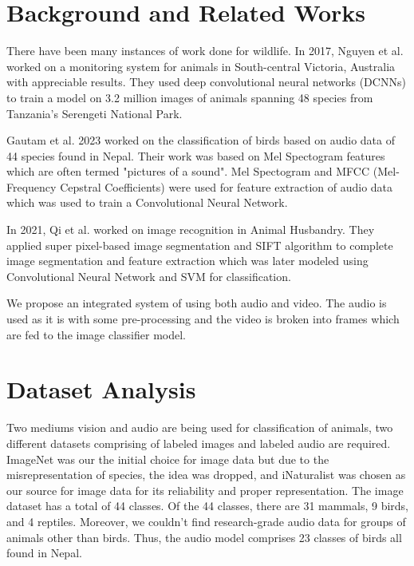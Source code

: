 \documentclass[fleqn, 10pt, twoside]{IOEGC}
\begin{document}
\section{Background and Related Works}
There have been many instances of work done for wildlife. In 2017, Nguyen et al.\cite{r4} worked on a monitoring system for animals in South-central Victoria, Australia with appreciable results. They used deep convolutional neural networks (DCNNs) to train a model on 3.2 million images of animals spanning 48 species from Tanzania's Serengeti National Park.
\par
Gautam et al. 2023 \cite{r5} worked on the classification of birds based on audio data of 44 species found in Nepal. Their work was based on Mel Spectogram features which are often termed "pictures of a sound". Mel Spectogram and MFCC (Mel-Frequency Cepstral Coefficients) were used for feature extraction of audio data which was used to train a Convolutional Neural Network.
\par
In 2021, Qi et al. \cite{r6} worked on image recognition in Animal Husbandry. They applied super pixel-based image segmentation and SIFT algorithm to complete image segmentation and feature extraction which was later modeled using Convolutional Neural Network and SVM for classification.
\par
We propose an integrated system of using both audio and video. The audio is used as it is with some pre-processing and the video is broken into frames which are fed to the image classifier model.

\section{Dataset Analysis}
Two mediums vision and audio are being used for
classification of animals, two different datasets comprising of
labeled images and labeled audio are required. ImageNet was our
the initial choice for image data but due to the misrepresentation of
species, the idea was dropped, and iNaturalist was chosen as our
source for image data for its reliability and proper
representation\cite{r9}.
The image dataset has a total of 44 classes. Of the 44 classes, there are 31 mammals, 9 birds, and 4 reptiles. Moreover, we couldn’t find research-grade audio data for groups of animals other than birds. Thus, the audio model comprises 23 classes of birds all found in Nepal.
\end{document}
